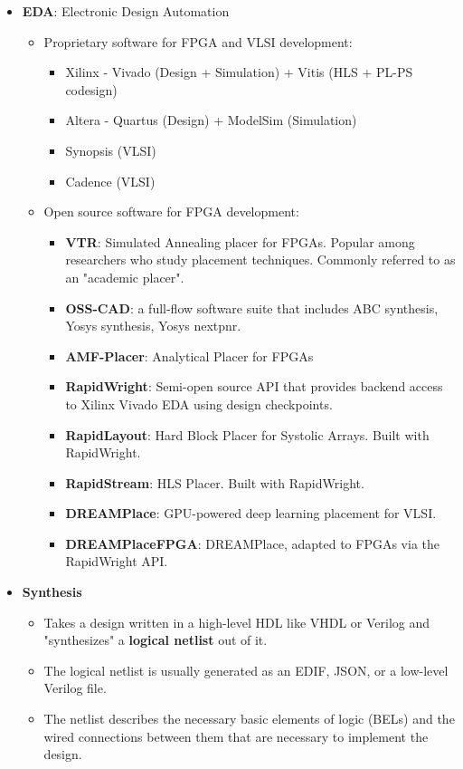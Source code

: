 \documentclass{article}
\begin{document}
\begin{itemize}[label={\textbullet}, left=0.25cm]
    \item \textbf{EDA}: Electronic Design Automation
    \begin{itemize}[label={--}, left=0.25cm]
        \item Proprietary software for FPGA and VLSI development:
        \begin{itemize}[label={$\cdot$}, left=0.25cm]
            \item Xilinx - Vivado (Design + Simulation) + Vitis (HLS + PL-PS codesign)
            \item Altera - Quartus (Design) + ModelSim (Simulation)
            \item Synopsis (VLSI)
            \item Cadence (VLSI)
        \end{itemize}
        \item Open source software for FPGA development:
        \begin{itemize}[label={$\cdot$}, left=0.25cm]
            \item \textbf{VTR}: Simulated Annealing placer for FPGAs. Popular among researchers who study placement techniques. 
                Commonly referred to as an "academic placer".
            \item \textbf{OSS-CAD}: a full-flow software suite that includes ABC synthesis, Yosys synthesis, Yosys nextpnr.
            \item \textbf{AMF-Placer}: Analytical Placer for FPGAs
            \item \textbf{RapidWright}: Semi-open source API that provides backend access to Xilinx Vivado EDA using design checkpoints.
            \item \textbf{RapidLayout}: Hard Block Placer for Systolic Arrays. Built with RapidWright.
            \item \textbf{RapidStream}: HLS Placer. Built with RapidWright.
            \item \textbf{DREAMPlace}: GPU-powered deep learning placement for VLSI.
            \item \textbf{DREAMPlaceFPGA}: DREAMPlace, adapted to FPGAs via the RapidWright API.
        \end{itemize}
    \end{itemize}
    
    \item \textbf{Synthesis}
    \begin{itemize}[label={--}, left=0.25cm]
        \item Takes a design written in a high-level HDL like VHDL or Verilog and "synthesizes" a \textbf{logical netlist} out of it. 
        \item The logical netlist is usually generated as an EDIF, JSON, or a low-level Verilog file. 
        \item The netlist describes the necessary basic elements of logic (BELs) and the wired connections between them that are necessary to implement the design.
    \end{itemize}


\end{itemize}
\end{document}
